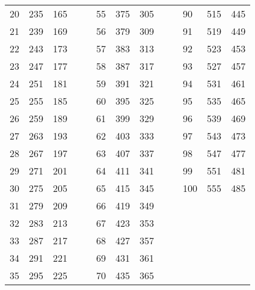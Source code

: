 \begin{table}[!h]
\begin{tabular}{|l|l|l|ll|l|l|l|lllll}
		20 & 235 & 165 &  &  & 55 & 375 & 305 &  & \multicolumn{1}{l|}{} & \multicolumn{1}{l|}{90} & \multicolumn{1}{l|}{515} & \multicolumn{1}{l|}{445} \\ \cline{1-3} \cline{6-8} \cline{11-13} 
		21 & 239 & 169 &  &  & 56 & 379 & 309 &  & \multicolumn{1}{l|}{} & \multicolumn{1}{l|}{91} & \multicolumn{1}{l|}{519} & \multicolumn{1}{l|}{449} \\ \cline{1-3} \cline{6-8} \cline{11-13} 
		22 & 243 & 173 &  &  & 57 & 383 & 313 &  & \multicolumn{1}{l|}{} & \multicolumn{1}{l|}{92} & \multicolumn{1}{l|}{523} & \multicolumn{1}{l|}{453} \\ \cline{1-3} \cline{6-8} \cline{11-13} 
		23 & 247 & 177 &  &  & 58 & 387 & 317 &  & \multicolumn{1}{l|}{} & \multicolumn{1}{l|}{93} & \multicolumn{1}{l|}{527} & \multicolumn{1}{l|}{457} \\ \cline{1-3} \cline{6-8} \cline{11-13} 
		24 & 251 & 181 &  &  & 59 & 391 & 321 &  & \multicolumn{1}{l|}{} & \multicolumn{1}{l|}{94} & \multicolumn{1}{l|}{531} & \multicolumn{1}{l|}{461} \\ \cline{1-3} \cline{6-8} \cline{11-13} 
		25 & 255 & 185 &  &  & 60 & 395 & 325 &  & \multicolumn{1}{l|}{} & \multicolumn{1}{l|}{95} & \multicolumn{1}{l|}{535} & \multicolumn{1}{l|}{465} \\ \cline{1-3} \cline{6-8} \cline{11-13} 
		26 & 259 & 189 &  &  & 61 & 399 & 329 &  & \multicolumn{1}{l|}{} & \multicolumn{1}{l|}{96} & \multicolumn{1}{l|}{539} & \multicolumn{1}{l|}{469} \\ \cline{1-3} \cline{6-8} \cline{11-13} 
		27 & 263 & 193 &  &  & 62 & 403 & 333 &  & \multicolumn{1}{l|}{} & \multicolumn{1}{l|}{97} & \multicolumn{1}{l|}{543} & \multicolumn{1}{l|}{473} \\ \cline{1-3} \cline{6-8} \cline{11-13} 
		28 & 267 & 197 &  &  & 63 & 407 & 337 &  & \multicolumn{1}{l|}{} & \multicolumn{1}{l|}{98} & \multicolumn{1}{l|}{547} & \multicolumn{1}{l|}{477} \\ \cline{1-3} \cline{6-8} \cline{11-13} 
		29 & 271 & 201 &  &  & 64 & 411 & 341 &  & \multicolumn{1}{l|}{} & \multicolumn{1}{l|}{99} & \multicolumn{1}{l|}{551} & \multicolumn{1}{l|}{481} \\ \cline{1-3} \cline{6-8} \cline{11-13} 
		30 & 275 & 205 &  &  & 65 & 415 & 345 &  & \multicolumn{1}{l|}{} & \multicolumn{1}{l|}{100} & \multicolumn{1}{l|}{555} & \multicolumn{1}{l|}{485} \\ \cline{1-3} \cline{6-8} \cline{11-13} 
		31 & 279 & 209 &  &  & 66 & 419 & 349 &  &  &  &  &  \\ \cline{1-3} \cline{6-8}
		32 & 283 & 213 &  &  & 67 & 423 & 353 &  &  &  &  &  \\ \cline{1-3} \cline{6-8}
		33 & 287 & 217 &  &  & 68 & 427 & 357 &  &  &  &  &  \\ \cline{1-3} \cline{6-8}
		34 & 291 & 221 &  &  & 69 & 431 & 361 &  &  &  &  &  \\ \cline{1-3} \cline{6-8}
		35 & 295 & 225 &  &  & 70 & 435 & 365 &  &  &  &  &  \\ \cline{1-3} \cline{6-8}
	\end{tabular}
\end{table}
\clearpage

